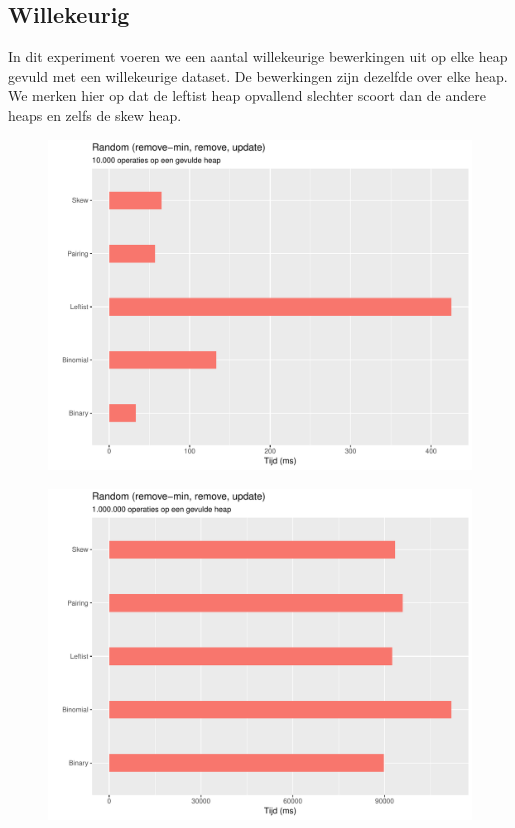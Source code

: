 \documentclass[a4paper,12pt]{report}
\begin{document}
\subsection{Willekeurig}
In dit experiment voeren we een aantal willekeurige bewerkingen uit op elke heap gevuld met een willekeurige dataset. De bewerkingen zijn dezelfde over elke heap. We merken hier op dat de leftist heap opvallend slechter scoort dan de andere heaps en zelfs de skew heap.
\begin{figure}[H]
	\includegraphics[scale=0.9]{grafieken/random_10k}
\end{figure}
\begin{figure}[H]
	\includegraphics[scale=0.9]{grafieken/random_1mil}
\end{figure}
\end{document}
